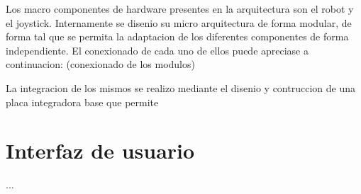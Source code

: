 Los macro componentes de hardware presentes en la arquitectura son el robot y el joystick.
Internamente se disenio su micro arquitectura de forma modular, de forma tal que se permita la adaptacion de los diferentes componentes de forma independiente.
El conexionado de cada uno de ellos puede apreciase a continuacion:
(conexionado de los modulos)

La integracion de los mismos se realizo mediante el disenio y contruccion de una placa integradora base que permite

\section{Interfaz de usuario}

...



